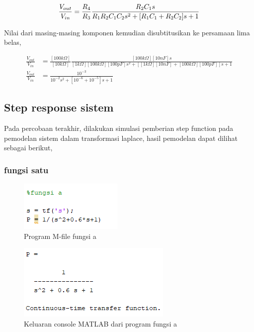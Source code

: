 \documentclass[12pt]{journal}
\begin{document}
\begin{equation}
    \frac{V_{out}}{V_{in}}= \frac{R_4}{R_3}\frac{R_2C_1s}{R_1R_2C_1C_2s^2+[R_1C_1+R_2C_2]s+1} \\[5pt]
\end{equation}

Nilai dari masing-masing komponen kemudian disubtitusikan ke persamaan lima belas,

\begin{equation*}
    \begin{split}
        \frac{V_{out}}{V_{in}} &= \frac{[100k\Omega]}{[10k\Omega]}\frac{[100k\Omega][10nF]s}{[1k\Omega][100k\Omega][100pF]s^2+[[1k\Omega][10nF]+[100k\Omega][100pF]]s+1} \\[5pt]
        \frac{V_{out}}{V_{in}} &= \frac{10^{-3}}{10^{-2}s^2+[10^{-6}+10^{-5}]s+1}
    \end{split}
\end{equation*}

\pagebreak

\subsection{Step response sistem}

Pada percobaan terakhir, dilakukan simulasi pemberian step function pada pemodelan sistem dalam transformasi laplace, hasil pemodelan dapat dilihat sebagai berikut,

\subsubsection{fungsi satu}

\begin{figure}[H]
    \centering
    \includegraphics{7_a.png}
    \caption{Program M-file fungsi a}
    \label{soal_a}
\end{figure}
\begin{figure}[H]
    \centering
    \includegraphics{hasil_7_a.png}
    \caption{Keluaran console MATLAB dari program fungsi a}
    \label{hasil_a}
\end{figure}
\end{document}
